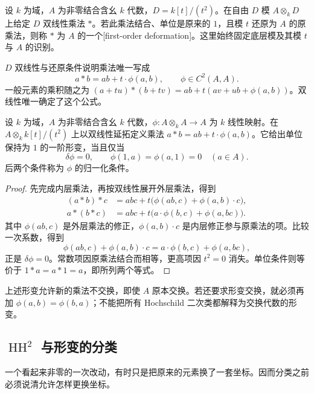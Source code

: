 \begin{definition}\label{b4:def:first-order-deformation}
	设 \(k\) 为域，\(A\) 为非零结合含幺 \(k\) 代数，\(D=k[t]/(t^2)\)。在自由 \(D\) 模 \(A\otimes_kD\) 上给定 \(D\) 双线性乘法 \(*\)。若此乘法结合、单位是原来的 \(1\)，且模 \(t\) 还原为 \(A\) 的原乘法，则称 \(*\) 为 \(A\) 的一个[first-order deformation]。这里始终固定底层模及其模 \(t\) 与 \(A\) 的识别。
\end{definition}

\(D\) 双线性与还原条件说明乘法唯一写成
\[
	a*b=ab+t\cdot\phi(a,b),\qquad \phi\in C^2(A,A).
\]
一般元素的乘积随之为 \((a+tu)*(b+tv)=ab+t(av+ub+\phi(a,b))\)。双线性唯一确定了这个公式。

\begin{proposition}\label{b4:prop:first-order-cocycles}
	设 \(k\) 为域，\(A\) 为非零结合含幺 \(k\) 代数，\(\phi:A\otimes_kA\to A\) 为 \(k\) 线性映射。在 \(A\otimes_k k[t]/(t^2)\) 上以双线性延拓定义乘法 \(a*b=ab+t\cdot\phi(a,b)\)。它给出单位保持为 \(1\) 的一阶形变，当且仅当
	\[
		\delta\phi=0,\qquad \phi(1,a)=\phi(a,1)=0\quad(a\in A).
	\]
	后两个条件称为 \(\phi\) 的归一化条件。
\end{proposition}
\begin{proof}
	先完成内层乘法，再按双线性展开外层乘法，得到
	\[
		\begin{aligned}
			(a*b)*c&=abc+t\bigl(\phi(ab,c)+\phi(a,b)\cdot c\bigr),\\
			a*(b*c)&=abc+t\bigl(a\cdot\phi(b,c)+\phi(a,bc)\bigr).
		\end{aligned}
	\]
	其中 \(\phi(ab,c)\) 是外层乘法的修正，\(\phi(a,b)\cdot c\) 是内层修正参与原乘法的项。比较一次系数，得到
	\[
		\phi(ab,c)+\phi(a,b)\cdot c=a\cdot\phi(b,c)+\phi(a,bc),
	\]
	正是 \(\delta\phi=0\)。常数项因原乘法结合而相等，更高项因 \(t^2=0\) 消失。单位条件则等价于 \(1*a=a*1=a\)，即所列两个等式。
\end{proof}

上述形变允许新的乘法不交换，即使 \(A\) 原本交换。若还要求形变交换，就必须再加 \(\phi(a,b)=\phi(b,a)\)；不能把所有 Hochschild 二次类都解释为交换代数的形变。

\subsection{\texorpdfstring{\(\operatorname{HH}^2\) 与形变的分类}{HH2 与形变的分类}}
\label{b4:subsec:1202:03}

一个看起来非零的一次改动，有时只是把原来的元素换了一套坐标。因而分类之前必须说清允许怎样更换坐标。

